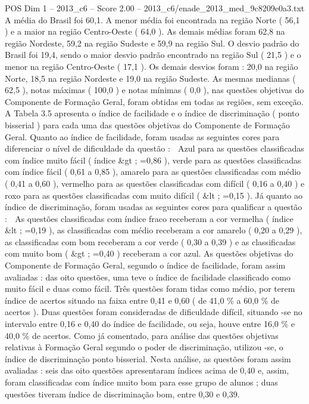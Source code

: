 \begin{textsample}{POS Dim 1 – 2013\_c6 – Score 2.00 – 2013\_c6/enade\_2013\_med\_9c8209e0a3.txt}
A média do Brasil foi 60,1.
A menor média foi encontrada na região Norte ( 56,1 ) e a maior na região Centro-Oeste ( 64,0 ).
As demais médias foram 62,8 na região Nordeste, 59,2 na região Sudeste e 59,9 na região Sul.
O desvio padrão do Brasil foi 19,4, sendo o maior desvio padrão encontrado na região Sul ( 21,5 ) e o menor na região Centro-Oeste ( 17,1 ).
Os demais desvios foram : 20,0 na região Norte, 18,5 na região Nordeste e 19,0 na região Sudeste.
As mesmas medianas ( 62,5 ), notas máximas ( 100,0 ) e notas mínimas ( 0,0 ), nas questões objetivas do Componente de Formação Geral, foram obtidas em todas as regiões, sem exceção.
A Tabela 3.5 apresenta o índice de facilidade e o índice de discriminação ( ponto bisserial ) para cada uma das questões objetivas do Componente de Formação Geral.
Quanto ao índice de facilidade, foram usadas as seguintes cores para diferenciar o nível de dificuldade da questão :  Azul para as questões classificadas com índice muito fácil ( índice \&gt ; =0,86 ), verde para as questões classificadas com índice fácil ( 0,61 a 0,85 ), amarelo para as questões classificadas com médio ( 0,41 a 0,60 ), vermelho para as questões classificadas com difícil ( 0,16 a 0,40 ) e roxo para as questões classificadas com muito difícil ( \&lt ; =0,15 ).
Já quanto ao índice de discriminação, foram usadas as seguintes cores para qualificar a questão :  As questões classificadas com índice fraco receberam a cor vermelha ( índice \&lt ; =0,19 ), as classificadas com médio receberam a cor amarelo ( 0,20 a 0,29 ), as classificadas com bom receberam a cor verde ( 0,30 a 0,39 ) e as classificadas com muito bom ( \&gt ; =0,40 ) receberam a cor azul.
As questões objetivas do Componente de Formação Geral, segundo o índice de facilidade, foram assim avaliadas : das oito questões, uma teve o índice de facilidade classificado como muito fácil e duas como fácil.
Três questões foram tidas como médio, por terem índice de acertos situado na faixa entre 0,41 e 0,60 ( de 41,0 \% a 60,0 \% de acertos ).
Duas questões foram consideradas de dificuldade difícil, situando -se no intervalo entre 0,16 e 0,40 do índice de facilidade, ou seja, houve entre 16,0 \% e 40,0 \% de acertos.
Como já comentado, para análise das questões objetivas relativas à Formação Geral segundo o poder de discriminação, utilizou -se, o índice de discriminação ponto bisserial.
Nesta análise, as questões foram assim avaliadas : seis das oito questões apresentaram índices acima de 0,40 e, assim, foram classificadas com índice muito bom para esse grupo de alunos ; duas questões tiveram índice de discriminação bom, entre 0,30 e 0,39.

\end{textsample}
